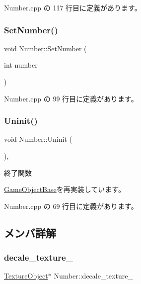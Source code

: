  Number.\+cpp の 117 行目に定義があります。

\mbox{\label{class_number_ac825b1ee1f46a6ac4ffd3bc904964745}} 
\subsubsection{\texorpdfstring{Set\+Number()}{SetNumber()}}
{\footnotesize\ttfamily void Number\+::\+Set\+Number (\begin{DoxyParamCaption}\item[{int}]{number }\end{DoxyParamCaption})}



 Number.\+cpp の 99 行目に定義があります。

\mbox{\label{class_number_a7c3bf9c55f7a0a19d80129c5f07f99f2}} 
\subsubsection{\texorpdfstring{Uninit()}{Uninit()}}
{\footnotesize\ttfamily void Number\+::\+Uninit (\begin{DoxyParamCaption}{ }\end{DoxyParamCaption})\hspace{0.3cm}{\ttfamily [override]}, {\ttfamily [virtual]}}



終了関数 



\mbox{\hyperlink{class_game_object_base_a97e1bc277d7b1c0156d4735de29a022c}{Game\+Object\+Base}}を再実装しています。



 Number.\+cpp の 69 行目に定義があります。



\subsection{メンバ詳解}
\mbox{\label{class_number_a305385aaec293089117c50fd1cf2575f}} 
\subsubsection{\texorpdfstring{decale\+\_\+texture\+\_\+}{decale\_texture\_}}
{\footnotesize\ttfamily \mbox{\hyperlink{class_texture_object}{Texture\+Object}}$\ast$ Number\+::decale\+\_\+texture\+\_\+}



